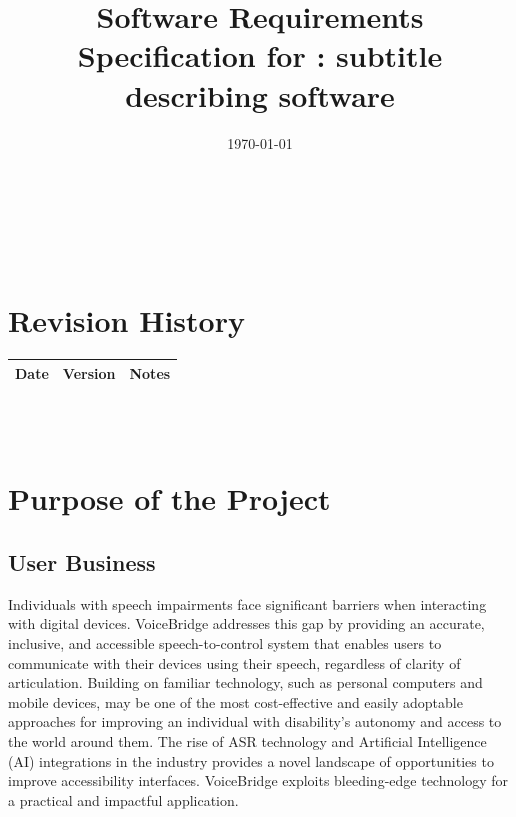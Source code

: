 \documentclass[12pt]{article}
\begin{document}
\title{Software Requirements Specification for \progname: subtitle describing software} 
\author{\authname}
\date{\today}
	
\maketitle

~\newpage


\tableofcontents

~\newpage

\section*{Revision History}

\begin{tabularx}{\textwidth}{p{3cm}p{2cm}X}
\toprule {\textbf{Date}} & {\textbf{Version}} & {\textbf{Notes}}\\
\midrule

\bottomrule
\end{tabularx}

~\\

~\newpage
\section{Purpose of the Project}
\subsection{User Business}


Individuals with speech impairments face significant barriers when interacting with digital devices. VoiceBridge addresses this gap by providing an accurate, inclusive, and accessible speech-to-control system that enables users to communicate with their devices using their speech, regardless of clarity of articulation. Building on familiar technology, such as personal computers and mobile devices, may be one of the most cost-effective and easily adoptable approaches for improving an individual with disability’s autonomy and access to the world around them. The rise of ASR technology and Artificial Intelligence (AI) integrations in the industry provides a novel landscape of opportunities to improve accessibility interfaces. VoiceBridge exploits bleeding-edge technology for a practical and impactful application.
\end{document}
